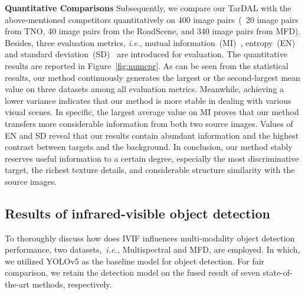 \documentclass[10pt,twocolumn,letterpaper]{article}
\begin{document}
\noindent\textbf{Quantitative Comparisons} Subsequently, we compare our TarDAL with the above-mentioned competitors quantitatively on 400 image pairs~(~20 image pairs from TNO, 40 image pairs from the RoadScene, and 340 image pairs from MFD). Besides, three evaluation metrics, \emph{i.e.}, mutual information~(MI)~\cite{Qu2002Information}, entropy~(EN)~\cite{Roberts2008Assessment} and standard deviation~(SD)~\cite{aslantas2015new} are introduced for evaluation. The quantitative results are reported in Figure~\ref{fig:numcpr}. As can be seen from the statistical results, our method continuously generates the largest or the second-largest mean value on three datasets among all evaluation metrics. Meanwhile, achieving a lower variance indicates that our method is more stable in dealing with various visual scenes. In specific, the largest average value on MI proves that our method transfers more considerable information from both two source images. Values of EN and SD reveal that our results contain abundant information and the highest contrast between targets and the background. In conclusion, our method stably reserves useful information to a certain degree, especially the most discriminative target, the richest texture details, and considerable structure similarity with the source images.

\subsection{Results of infrared-visible object detection}
To thoroughly discuss how does IVIF influences multi-modality object detection performance, two datasets,~\emph{i.e.,} Multispectral and MFD, are employed. In which, we utilized YOLOv5 as the baseline model for object detection. For fair comparison, we retain the detection model on the fused result of seven state-of-the-art methods, respectively.
\end{document}
